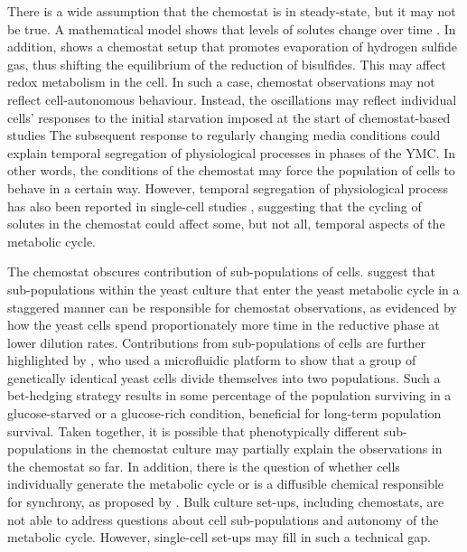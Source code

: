 There is a wide assumption that the chemostat is in steady-state, but it may not be true.
A mathematical model shows that levels of solutes change over time \citep{jonesCyberneticModelGrowth1999}.
In addition, \citet{oneillEukaryoticCellBiology2020} shows a chemostat setup that promotes evaporation of hydrogen sulfide gas, thus shifting the equilibrium of the reduction of bisulfides.
This may affect redox metabolism in the cell.
In such a case, chemostat observations may not reflect cell-autonomous behaviour.
Instead, the oscillations may reflect individual cells' responses to the initial starvation imposed at the start of chemostat-based studies
The subsequent response to regularly changing media conditions could explain temporal segregation of physiological processes in phases of the YMC.
In other words, the conditions of the chemostat may force the population of cells to behave in a certain way.
However, temporal segregation of physiological process has also been reported in single-cell studies \citep{takhaveevTemporalSegregationBiosynthetic2023}, suggesting that the cycling of solutes in the chemostat could affect some, but not all, temporal aspects of the metabolic cycle.

The chemostat obscures contribution of sub-populations of cells.
\citet{burnettiCellCycleStart2016} suggest that sub-populations within the yeast culture that enter the yeast metabolic cycle in a staggered manner can be responsible for chemostat observations, as evidenced by how the yeast cells spend proportionately more time in the reductive phase at lower dilution rates.
Contributions from sub-populations of cells are further highlighted by \citet{bagameryPutativeBetHedgingStrategy2020}, who used a microfluidic platform to show that a group of genetically identical yeast cells divide themselves into two populations.
Such a bet-hedging strategy results in some percentage of the population surviving in a glucose-starved or a glucose-rich condition, beneficial for long-term population survival.
Taken together, it is possible that phenotypically different sub-populations in the chemostat culture may partially explain the observations in the chemostat so far.
In addition, there is the question of whether cells individually generate the metabolic cycle or is a diffusible chemical responsible for synchrony, as proposed by \citet{krishnaMinimalPushPull2018}.
Bulk culture set-ups, including chemostats, are not able to address questions about cell sub-populations and autonomy of the metabolic cycle.
However, single-cell set-ups may fill in such a technical gap.

